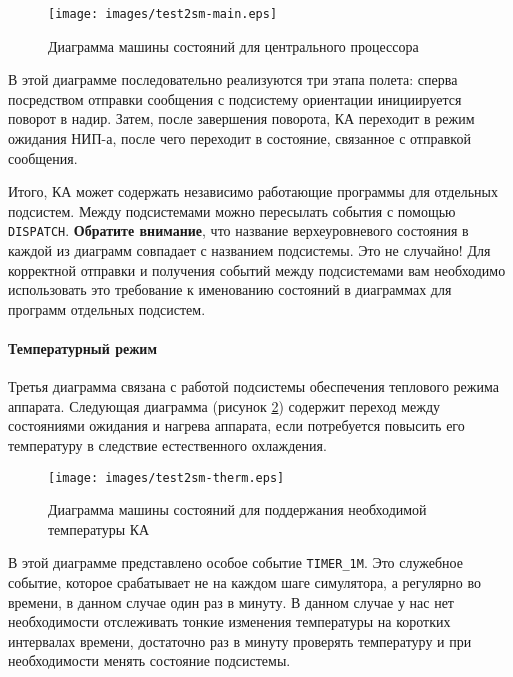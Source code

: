 \documentclass[12pt,a4paper]{article}
\begin{document}
\begin{figure}[tbh]
  \begin{center}
    \texttt{[image: images/test2sm-main.eps]}
    \caption{Диаграмма машины состояний для центрального процессора}
    \label{Pic:Test2SM-Main}
  \end{center}
\end{figure}

В этой диаграмме последовательно реализуются три этапа полета: сперва посредством отправки
сообщения с подсистему ориентации инициируется поворот в надир. Затем, после завершения
поворота, КА переходит в режим ожидания НИП-а, после чего переходит в состояние, связанное
с отправкой сообщения.

Итого, КА может содержать независимо работающие программы для отдельных подсистем. Между
подсистемами можно пересылать события с помощью \verb'DISPATCH'. \textbf{Обратите
  внимание}, что название верхеуровневого состояния в каждой из диаграмм совпадает с
названием подсистемы. Это не случайно! Для корректной отправки и получения событий между
подсистемами вам необходимо использовать это требование к именованию состояний в
диаграммах для программ отдельных подсистем.

\paragraph{Температурный режим} Третья диаграмма связана с работой подсистемы обеспечения
теплового режима аппарата. Следующая диаграмма (рисунок \ref{Pic:Test2SM-Therm}) содержит
переход между состояниями ожидания и нагрева аппарата, если потребуется повысить его
температуру в следствие естественного охлаждения.

\begin{figure}[tbh]
  \begin{center}
    \texttt{[image: images/test2sm-therm.eps]}
    \caption{Диаграмма машины состояний для поддержания необходимой температуры КА}
    \label{Pic:Test2SM-Therm}
  \end{center}
\end{figure}

В этой диаграмме представлено особое событие \verb'TIMER_1M'. Это служебное событие,
которое срабатывает не на каждом шаге симулятора, а регулярно во времени, в данном случае
один раз в минуту. В данном случае у нас нет необходимости отслеживать тонкие изменения
температуры на коротких интервалах времени, достаточно раз в минуту проверять температуру
и при необходимости менять состояние подсистемы.
\end{document}
